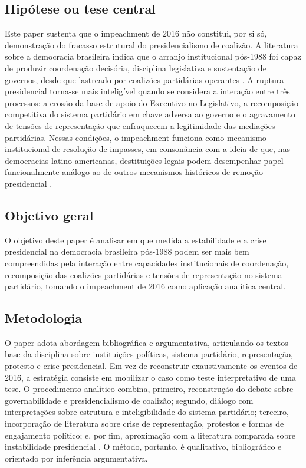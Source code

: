 \documentclass[12pt,a4paper]{article}
\begin{document}
\subsection{Hipótese ou tese central}
\label{sec:org44ef1e9}
Este paper sustenta que o impeachment de 2016 não constitui, por si só, demonstração do fracasso estrutural do presidencialismo de coalizão. A literatura sobre a democracia brasileira indica que o arranjo institucional pós-1988 foi capaz de produzir coordenação decisória, disciplina legislativa e sustentação de governos, desde que lastreado por coalizões partidárias operantes \textcite{palermo2000_como_se} \textcite{limongi2017_a_crise}. A ruptura presidencial torna-se mais inteligível quando se considera a interação entre três processos: a erosão da base de apoio do Executivo no Legislativo, a recomposição competitiva do sistema partidário em chave adversa ao governo e o agravamento de tensões de representação que enfraquecem a legitimidade das mediações partidárias. Nessas condições, o impeachment funciona como mecanismo institucional de resolução de impasses, em consonância com a ideia de que, nas democracias latino-americanas, destituições legais podem desempenhar papel funcionalmente análogo ao de outros mecanismos históricos de remoção presidencial \textcite{perez_lian2016_explaining_military}.

\subsection{Objetivo geral}
\label{sec:org851e999}
O objetivo deste paper é analisar em que medida a estabilidade e a crise presidencial na democracia brasileira pós-1988 podem ser mais bem compreendidas pela interação entre capacidades institucionais de coordenação, recomposição das coalizões partidárias e tensões de representação no sistema partidário, tomando o impeachment de 2016 como aplicação analítica central.

\subsection{Metodologia}
\label{sec:org555ef6e}
O paper adota abordagem bibliográfica e argumentativa, articulando os textos-base da disciplina sobre instituições políticas, sistema partidário, representação, protesto e crise presidencial. Em vez de reconstruir exaustivamente os eventos de 2016, a estratégia consiste em mobilizar o caso como teste interpretativo de uma tese. O procedimento analítico combina, primeiro, reconstrução do debate sobre governabilidade e presidencialismo de coalizão; segundo, diálogo com interpretações sobre estrutura e inteligibilidade do sistema partidário; terceiro, incorporação de literatura sobre crise de representação, protestos e formas de engajamento político; e, por fim, aproximação com a literatura comparada sobre instabilidade presidencial \textcite{alonso2016_changing_repertoires} \textcite{singersd_tres_partidos} \textcite{alves2024_rage_within} \textcite{perez_lian2016_explaining_military}. O método, portanto, é qualitativo, bibliográfico e orientado por inferência argumentativa.
\end{document}
